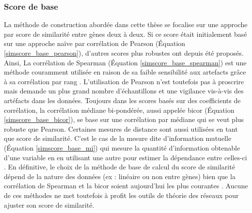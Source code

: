 \subsubsection{Score de base}

La méthode de construction abordée dans cette thèse se focalise sur une approche par score de similarité entre gènes deux à deux. Si ce score était initialement basé sur une approche naïve par corrélation de Pearson \cite{Carter2004} (Équation \ref{simscore_base_pearson}), d'autres scores plus robustes ont depuis été proposés. Ainsi, La corrélation de Spearman (Équation \ref{simscore_base_spearman}) est une méthode couramment utilisée en raison de sa faible sensibilité aux artefacts grâce à sa corrélation par rang \cite{Chowdhury2019,Serin2016,Kuehne2017}. L'utilisation de Pearson n'est toutefois pas à proscrire mais demande un plus grand nombre d'échantillons et une vigilance vis-à-vis des artéfacts dans les données. Toujours dans les scores basés sur des coefficients de corrélation, la corrélation médiane bi-pondérée, aussi appelée bicor \cite{Song2012} (Équation \ref{simscore_base_bicor}), se base sur une corrélation par médiane qui se veut plus robuste que Pearson. Certaines mesures de distance sont aussi utilisées en tant que score de similarité. C'est le cas de la mesure dite d'information mutuelle (Équation \ref{simscore_base_mi}) qui mesure la quantité d'information obtenable d'une variable en en utilisant une autre pour estimer la dépendance entre celles-ci \cite{Kullback1997}. En définitive, le choix de la méthode de base de calcul du score de similarité dépend de la nature des données (ex : linéaire ou non entre gènes) bien que la corrélation de Spearman et la bicor soient aujourd'hui les plus courantes \cite{Serin2016}. Aucune de ces méthodes ne met toutefois à profit les outils de théorie des réseaux pour ajuster son score de similarité.


